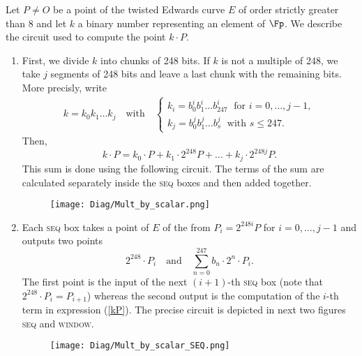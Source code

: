 Let $P\not= O$ be a point of the twisted Edwards curve $E$ of order strictly greater than 8 and let $k$ a binary number representing an element of $\Fp$. We describe the circuit used to compute the point $k\cdot P$.

\begin{enumerate}
	
	\item First, we divide $k$ into chunks of 248 bits. If $k$ is not a multiple of 248, we take $j$ segments of 248 bits and leave a last chunk with the remaining bits. More precisly, write 
		\begin{gather*}
		k = k_0 k_1 \dots k_j 	\quad\text{with}\quad 
			\begin{cases}
			k_i = b^i_0 b^i_1 \dots b^i_{247} 	\;\text{ for }  i = 0, \dots, j-1, \\
			k_j = b^j_0 b^j_1 \dots b^j_s 	\;\text{ with } s\leq 247.
			\end{cases}
		\end{gather*}
	Then,  
		\begin{equation}
		\label{kP}
			k\cdot P = k_0\cdot P + k_1\cdot 2^{248}P +\dots+ k_j\cdot 2^{248j}P. 	
 		\end{equation}
	This sum is done using the following circuit. 
	The terms of the sum are calculated separately inside the \textsc{seq} boxes and then added together. 

	\begin{figure}[h]
		\centering
		\texttt{[image: Diag/Mult\_by\_scalar.png]}
	\end{figure}
	
	\item Each \textsc{seq} box takes a point of $E$ of the from $P_i = 2^{248 i} P$ for $i=0,\dots,j-1$ and outputs two points %
		$$ 	
			2^{248} \cdot P_i 
			\quad \text{and} \quad
			\sum_{n = 0}^{247} b_n \cdot 2^{n} \cdot P_i. 
		$$
	The first point is the input of the next $(i+1)$-th \textsc{seq} box (note that $ 2^{248} \cdot P_i = P_{i+1}$) whereas the second output is the computation of the $i$-th term in expression (\ref{kP}). The precise circuit is depicted in next two figures \textsc{seq} and \textsc{window}.
	
	\begin{figure}[h]
		\centering
		\texttt{[image: Diag/Mult\_by\_scalar\_SEQ.png]}\\
		\vspace{0.5cm}
		

\end{figure}
\end{enumerate}

